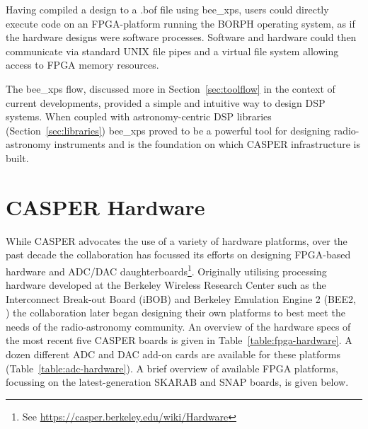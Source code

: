 \documentclass{ws-jai}
\begin{document}
Having compiled a design to a .bof file using bee\_xps, users could directly execute code on an FPGA-platform running the BORPH operating system, as if the hardware designs were software processes. Software and hardware could then communicate via standard UNIX file pipes and a virtual file system allowing access to FPGA memory resources.

The bee\_xps flow, discussed more in Section~\ref{sec:toolflow} in the context of current developments, provided a simple and intuitive way to design DSP systems. When coupled with astronomy-centric DSP libraries (Section~\ref{sec:libraries}) bee\_xps proved to be a powerful tool for designing radio-astronomy instruments and is the foundation on which CASPER infrastructure is built.

\section{CASPER Hardware} \label{sec:Hardware}

While CASPER advocates the use of a variety of hardware platforms, over the past decade the collaboration has focussed its efforts on designing FPGA-based hardware and ADC/DAC daughterboards\footnote{See \url{https://casper.berkeley.edu/wiki/Hardware}}. Originally utilising processing hardware developed at the Berkeley Wireless Research Center such as the Interconnect Break-out Board (iBOB) and Berkeley Emulation Engine 2 (BEE2, \citet{bee2}) the collaboration later began designing their own platforms to best meet the needs of the radio-astronomy community. An overview of the hardware specs of the most recent five CASPER boards is given in Table~\ref{table:fpga-hardware}. A dozen different ADC and DAC add-on cards are available for these platforms (Table~\ref{table:adc-hardware}). A brief overview of available FPGA platforms, focussing on the latest-generation SKARAB and SNAP boards, is given below.
\end{document}
